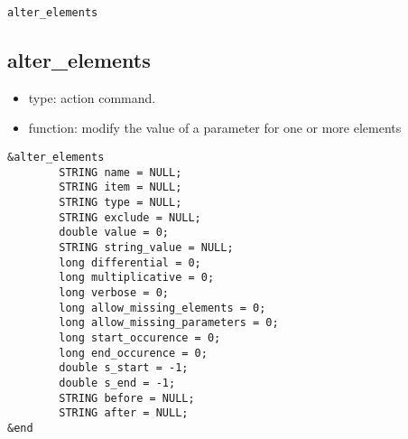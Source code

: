 \documentclass[11pt]{article}
\begin{document}
\begin{latexonly}
\newpage
\begin{center}{\Large\verb|alter_elements|}\end{center}
\end{latexonly}
\subsection{alter\_elements\label{subsec:alterelements}}

\begin{itemize}
\item type: action command.
\item function: modify the value of a parameter for one or more elements
\end{itemize}

\begin{verbatim}
&alter_elements
        STRING name = NULL;
        STRING item = NULL;
        STRING type = NULL;
        STRING exclude = NULL;
        double value = 0;
        STRING string_value = NULL;
        long differential = 0;
        long multiplicative = 0;
        long verbose = 0;
        long allow_missing_elements = 0;
        long allow_missing_parameters = 0;
        long start_occurence = 0;
        long end_occurence = 0;
        double s_start = -1;
        double s_end = -1;
        STRING before = NULL;
        STRING after = NULL;
&end
\end{verbatim}
\end{document}
